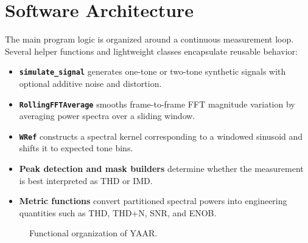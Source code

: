 \documentclass[conference]{IEEEtran}
\begin{document}
\section{Software Architecture}
The main program logic is organized around a continuous measurement loop. Several helper functions and lightweight classes encapsulate reusable behavior:
\begin{itemize}[leftmargin=*,nosep]
    \item \textbf{\texttt{simulate\_signal}} generates one-tone or two-tone synthetic signals with optional additive noise and distortion.
    \item \textbf{\texttt{RollingFFTAverage}} smooths frame-to-frame FFT magnitude variation by averaging power spectra over a sliding window.
    \item \textbf{\texttt{WRef}} constructs a spectral kernel corresponding to a windowed sinusoid and shifts it to expected tone bins.
    \item \textbf{Peak detection and mask builders} determine whether the measurement is best interpreted as THD or IMD.
    \item \textbf{Metric functions} convert partitioned spectral powers into engineering quantities such as THD, THD+N, SNR, and ENOB.
\end{itemize}

\begin{figure}[t]
\centering
{}
\caption{Functional organization of YAAR.}
\label{fig:architecture}
\end{figure}
\end{document}

